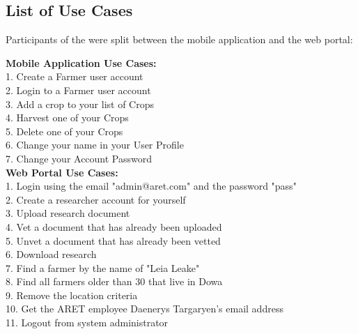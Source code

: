 \documentclass[12pt,letterpaper]{article}
\begin{document}
\subsection{List of Use Cases}
Participants of the were split between the mobile application and the web portal:

\textbf{Mobile Application Use Cases:}\\
1.\hspace*{8pt} Create a Farmer user account\\
2.\hspace*{8pt} Login to a Farmer user account\\
3.\hspace*{8pt} Add a crop to your list of Crops\\
4.\hspace*{8pt} Harvest one of your Crops\\
5.\hspace*{8pt} Delete one of your Crops\\
6.\hspace*{8pt} Change your name in your User Profile\\
7.\hspace*{8pt} Change your Account Password\\

\textbf{Web Portal Use Cases:}\\
1.\hspace*{8pt} Login using the email "admin@aret.com" and the password "pass"\\
2.\hspace*{8pt} Create a researcher account for yourself\\
3.\hspace*{8pt} Upload research document\\
4.\hspace*{8pt} Vet a document that has already been uploaded\\
5.\hspace*{8pt} Unvet a document that has already been vetted\\
6.\hspace*{8pt} Download research\\
7.\hspace*{8pt} Find a farmer by the name of "Leia Leake"\\
8.\hspace*{8pt} Find all farmers older than 30 that live in Dowa\\
9.\hspace*{8pt} Remove the location criteria\\
10.\hspace*{3pt} Get the ARET employee Daenerys Targaryen's email address\\
11.\hspace*{3pt} Logout from system administrator
\end{document}
